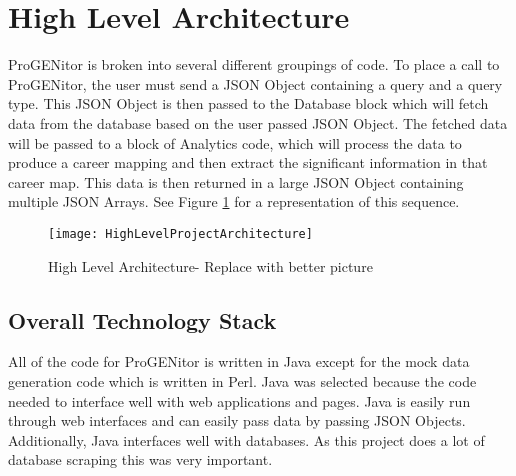 \section{High Level Architecture}
\label{sect:high-level-architecture}
ProGENitor is broken into several different groupings of code.  To place a call
to ProGENitor, the user must send a JSON Object containing a query and a query
type.  This JSON Object is then passed to the Database block which will fetch
data from the database based on the user passed JSON Object.  The fetched data
will be passed to a block of Analytics code, which will process the data to
produce a career mapping and then extract the significant information in that
career map.  This data is then returned in a large JSON Object containing multiple JSON
Arrays. See Figure
\ref{fig:HighLevelProjectArchitecture}
for a representation of this sequence.

\begin{figure}[H]
  \centering
  \texttt{[image: HighLevelProjectArchitecture]}
  \caption{High Level Architecture- Replace with better picture}
  \label{fig:HighLevelProjectArchitecture}
\end{figure}

\subsection{Overall Technology Stack}
All of the code for ProGENitor is written in Java except for the mock data
generation code which is written in Perl.  Java was selected because the code
needed to interface well with web applications and pages.  Java is easily run through
web interfaces and can easily pass data by passing JSON Objects.  Additionally,
Java interfaces well with databases.  As this project does a lot of database
scraping this was very important.

